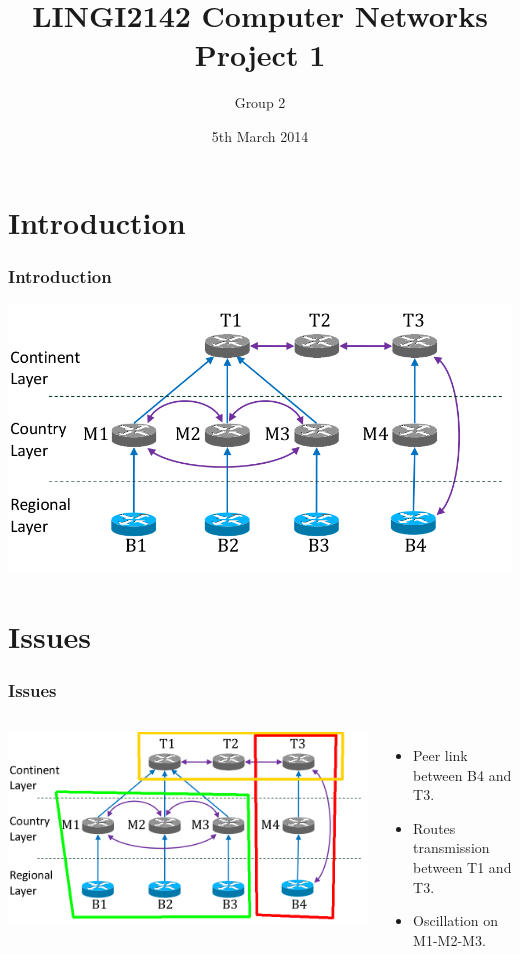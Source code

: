 \documentclass[handout,usenames,dvipsnames]{beamer}
\title[LINGI2142 Project 1]{LINGI2142 Computer Networks \\ Project 1} %
\author[Group 2] {Group 2} %
\institute[UCL] %
{
Université Catholique de Louvain \\ %
\medskip

}
\date{5th March 2014} %
\begin{document}
\begin{frame}
\titlepage %
\end{frame}

\section{Introduction}
\begin{frame}
\frametitle{Introduction}
\includegraphics[scale=0.35]{bgg-sessions.png}
\end{frame}

\section{Issues}
\begin{frame}
\frametitle{Issues}
\begin{columns}[cc]
\includegraphics[width=1.5\textwidth]{issues.png}

\begin{itemize}
	\item Peer link between B4 and T3.
	\item Routes transmission between T1 and T3.
	\item Oscillation on M1-M2-M3.
\end{itemize}
\end{columns}
\end{frame}
\end{document}
